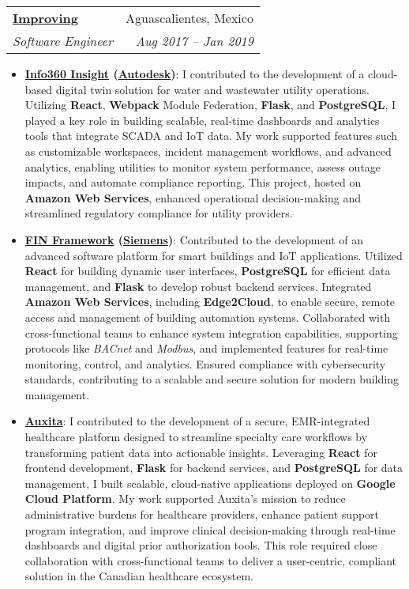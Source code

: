 \documentclass[letterpaper,11pt]{article}
\makeatletter
\newcommand{\resumeItem}[2]{
  \item\small{
    \textbf{#1}{: #2 \vspace{-2pt}}
  }
}
\newcommand{\resumeSubheading}[4]{
  \vspace{-1pt}\item
    \begin{tabular*}{0.97\textwidth}[t]{l@{\extracolsep{\fill}}r}
      \textbf{#1} & #2 \\
      \textit{\small#3} & \textit{\small #4} \\
    \end{tabular*}\vspace{-5pt}
}
\newcommand{\resumeItemListStart}{\begin{itemize}}
\newcommand{\resumeItemListEnd}{\end{itemize}\vspace{-5pt}}
\makeatother
\begin{document}
  \resumeSubheading
    {\href{https://www.improving.com/}{Improving}}{Aguascalientes, Mexico}
    {Software Engineer}{Aug 2017 -- Jan 2019}
    \resumeItemListStart
      \resumeItem{\href{https://www.autodesk.com/products/info360-insight/overview}{Info360 Insight} (\href{https://www.autodesk.com/}{Autodesk})}
        {I contributed to the development of a cloud-based digital twin solution for water and wastewater utility operations. Utilizing \textbf{React}, \textbf{Webpack} Module Federation, \textbf{Flask}, and \textbf{PostgreSQL}, I played a key role in building scalable, real-time dashboards and analytics tools that integrate SCADA and IoT data. My work supported features such as customizable workspaces, incident management workflows, and advanced analytics, enabling utilities to monitor system performance, assess outage impacts, and automate compliance reporting. This project, hosted on \textbf{Amazon Web Services}, enhanced operational decision-making and streamlined regulatory compliance for utility providers.}
      \resumeItem{\href{https://www.j2inn.com/finframework}{FIN Framework} (\href{https://www.siemens.com/}{Siemens})}
        {Contributed to the development of an advanced software platform for smart buildings and IoT applications. Utilized \textbf{React} for building dynamic user interfaces, \textbf{PostgreSQL} for efficient data management, and \textbf{Flask} to develop robust backend services. Integrated \textbf{Amazon Web Services}, including \textbf{Edge2Cloud}, to enable secure, remote access and management of building automation systems. Collaborated with cross-functional teams to enhance system integration capabilities, supporting protocols like \textit{BACnet} and \textit{Modbus}, and implemented features for real-time monitoring, control, and analytics. Ensured compliance with cybersecurity standards, contributing to a scalable and secure solution for modern building management.}
      \resumeItem{\href{https://auxita.com/}{Auxita}}
        {I contributed to the development of a secure, EMR-integrated healthcare platform designed to streamline specialty care workflows by transforming patient data into actionable insights. Leveraging \textbf{React} for frontend development, \textbf{Flask} for backend services, and \textbf{PostgreSQL} for data management, I built scalable, cloud-native applications deployed on \textbf{Google Cloud Platform}. My work supported Auxita’s mission to reduce administrative burdens for healthcare providers, enhance patient support program integration, and improve clinical decision-making through real-time dashboards and digital prior authorization tools. This role required close collaboration with cross-functional teams to deliver a user-centric, compliant solution in the Canadian healthcare ecosystem.}
    \resumeItemListEnd
\end{document}
